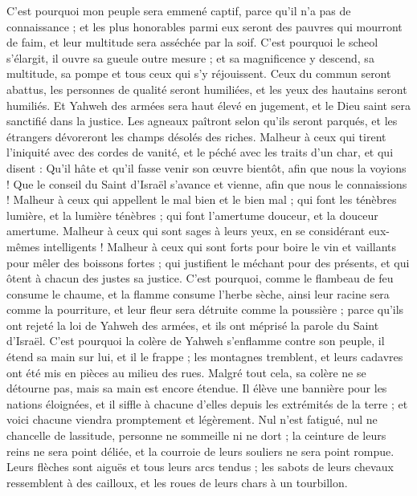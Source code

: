 \begin{multicols}{2}
C'est pourquoi mon peuple sera emmené captif, parce qu'il n'a pas de connaissance ; et les plus honorables parmi eux seront des pauvres qui mourront de faim, et leur multitude sera asséchée par la soif.
C'est pourquoi le scheol s'élargit, il ouvre sa gueule outre mesure ; et sa magnificence y descend, sa multitude, sa pompe et tous ceux qui s'y réjouissent.
Ceux du commun seront abattus, les personnes de qualité seront humiliées, et les yeux des hautains seront humiliés.
Et Yahweh des armées sera haut élevé en jugement, et le Dieu saint sera sanctifié dans la justice.
Les agneaux paîtront selon qu'ils seront parqués, et les étrangers dévoreront les champs désolés des riches.
Malheur à ceux qui tirent l'iniquité avec des cordes de vanité, et le péché avec les traits d'un char,
et qui disent : Qu'il hâte et qu'il fasse venir son œuvre bientôt, afin que nous la voyions ! Que le conseil du Saint d'Israël s'avance et vienne, afin que nous le connaissions !
Malheur à ceux qui appellent le mal bien et le bien mal ; qui font les ténèbres lumière, et la lumière ténèbres ; qui font l'amertume douceur, et la douceur amertume.
Malheur à ceux qui sont sages à leurs yeux, en se considérant eux-mêmes intelligents !
Malheur à ceux qui sont forts pour boire le vin et vaillants pour mêler des boissons fortes ;
qui justifient le méchant pour des présents, et qui ôtent à chacun des justes sa justice.
C'est pourquoi, comme le flambeau de feu consume le chaume, et la flamme consume l'herbe sèche, ainsi leur racine sera comme la pourriture, et leur fleur sera détruite comme la poussière ; parce qu'ils ont rejeté la loi de Yahweh des armées, et ils ont méprisé la parole du Saint d'Israël.
C'est pourquoi la colère de Yahweh s'enflamme contre son peuple, il étend sa main sur lui, et il le frappe ; les montagnes tremblent, et leurs cadavres ont été mis en pièces au milieu des rues. Malgré tout cela, sa colère ne se détourne pas, mais sa main est encore étendue.
Il élève une bannière pour les nations éloignées, et il siffle à chacune d'elles depuis les extrémités de la terre ; et voici chacune viendra promptement et légèrement.
Nul n'est fatigué, nul ne chancelle de lassitude, personne ne sommeille ni ne dort ; la ceinture de leurs reins ne sera point déliée, et la courroie de leurs souliers ne sera point rompue.
Leurs flèches sont aiguës et tous leurs arcs tendus ; les sabots de leurs chevaux ressemblent à des cailloux, et les roues de leurs chars à un tourbillon.

\end{multicols}

